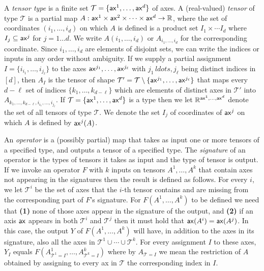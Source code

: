 \documentclass{article}
\begin{document}
A \emph{tensor type} is a finite set $\mathcal{T} = \{ \mathsf{ax}^1,\ldots, \mathsf{ax}^d \}$ of axes.
A  (real-valued) \emph{tensor} of type $\mathcal{T}$ is a partial map $A:\mathsf{ax}^1 \times \mathsf{ax}^2 \times \cdots \times \mathsf{ax}^d \rightarrow \mathbb{R}$,
where the set of coordinates $(i_1,\ldots,i_d)$ on which $A$ is defined is a product set $I_1 \times \cdots I_d$ where $I_j \subseteq \mathsf{ax}^j$ for $j=1 \ldots d$.
We write $A(i_1,\ldots,i_d)$ or $A_{i_1,\ldots,i_d}$ for the corresponding coordinate.
Since $i_1,\ldots,i_d$ are elements of disjoint sets, we can write the indices or inputs in any order without ambiguity.
If we supply a partial assignment $I = \{ i_{i_1},\ldots,i_{j_\ell} \}$ to the axes $\mathsf{ax}^{j_1},\ldots,\mathsf{ax}^{j_\ell}$ with $j_1\,ldots,j_\ell$ being distinct indices in  $[d]$, then $A_I$ is the tensor of shape $\mathcal{T}' = \mathcal{T} \setminus \{ \mathsf{ax}^{j_1},\ldots,\mathsf{ax}^{j_\ell} \}$ that maps every $d-\ell$ set of indices $\{ k_1,\ldots,k_{d-\ell} \}$ which are elements of distinct axes in $\mathcal{T}'$ into $A_{k_1,\ldots,k_{d-\ell}, i_{i_1},\ldots,i_{j_\ell}}$.
If $\mathcal{T} = \{ \mathsf{ax}^1,\ldots, \mathsf{ax}^d \}$ is a type then we let $\mathbb{R}^{\mathsf{ax}^1,\ldots, \mathsf{ax}^d }$ denote the set of all tensors of type $\mathcal{T}$.
We denote the set $I_j$ of coordinates of $\mathsf{ax}^j$ on which $A$ is defined by $\mathsf{ax}^j(A)$. 


An \emph{operator}  is a (possibly partial) map that takes as input one or more tensors of a specified type, and outputs a tensor of a specified type.
The \emph{signature} of an operator is the types of tensors it takes as input and the type of tensor is output.
If we invoke an operator $F$ with $k$ inputs on tensors $A^1,\ldots,A^k$  that contain axes not appearing in the signatures then the result is defined as follows.
For every $i$, we let $\mathcal{T}^i$ be the set of axes that the $i$-th tensor contains and are missing from the corresponding part of  $F$'s signature.
For $F(A^1,\ldots,A^k)$ to be defined we need that \textbf{(1)} none of those axes appear in the signature of the output, and \textbf{(2)} if an axis $\mathsf{ax}$ appears in both $\mathcal{T}^i$ and $\mathcal{T}^j$ then it must hold that  $\mathsf{ax}(A^i)=\mathsf{ax}(A^j)$. 
In this case,   the output $Y$ of $F(A^1,\ldots,A^k)$ will have, in addition to the axes in its signature, also all the axes in $\mathcal{T}^1 \cup \cdots \cup \mathcal{T}^k$.
For every assignment $I$ to these axes, $Y_I$ equals $F(A^1_{\mathcal{T}^1=I},\ldots, A^k_{\mathcal{T}^k=I})$ where by $A_{\mathcal{T}=I}$ we mean the restriction of $A$ obtained by assigning to every ax in $\mathcal{T}$ the corresponding index in $I$. 
\end{document}
